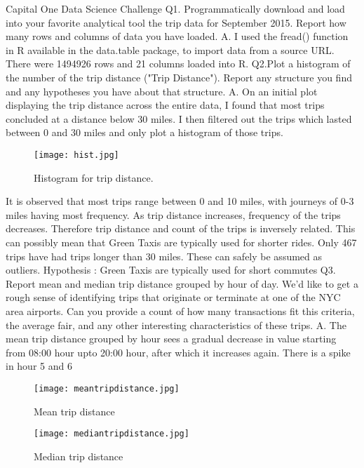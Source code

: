 \documentclass{article}
\begin{document}
\usepackage{graphicx}
\usepackage[space]{grffile}
\graphicspath{{C:\Users\vijay\Desktop}}
Capital One Data Science Challenge \newline
Q1.  Programmatically download and load into your favorite analytical tool the trip data for September 2015. Report how many rows and columns of data you have loaded.\newline
A. I used the fread() function in R available in the data.table package, to import data from a source URL.\newline
There were 1494926 rows and 21 columns loaded into R.\newline
\newline
Q2.Plot a histogram of the number of the trip distance ("Trip Distance"). Report any structure you find and any hypotheses you have about that structure.\newline
A. On an initial plot displaying the trip distance across the entire data, I found that most trips concluded at a distance below 30 miles. I then filtered out the trips which lasted between 0 and 30 miles and only plot a histogram of those trips.\newline
\begin{figure}
  \texttt{[image: hist.jpg]}
  \caption{Histogram for trip distance.}
  \label{fig:Histogram 1}
\end{figure}
\newline
It is observed that most trips range between 0 and 10 miles, with journeys of 0-3 miles having most frequency. As trip distance increases, frequency of the trips decreases. Therefore trip distance and count of the trips is inversely related. This can possibly mean that Green Taxis are typically used for shorter rides.
Only 467 trips have had trips longer than 30 miles. These can safely be assumed as outliers.\newline
Hypothesis : Green Taxis are typically used for short commutes\newline
\newline
Q3. Report mean and median trip distance grouped by hour of day. We'd like to get a rough sense of identifying trips that originate or terminate at one of the NYC area airports. Can you provide a count of how many transactions fit this criteria, the average fair, and any other interesting characteristics of these trips.\newline
A.  The mean trip distance grouped by hour sees a gradual decrease in value starting from 08:00 hour upto 20:00 hour, after which it increases again. There is a spike in hour 5 and 6\newline
\begin{figure}
  \texttt{[image: meantripdistance.jpg]}
  \caption{Mean trip distance}
  \label{fig:Plot 2}
\end{figure} 
\newline
\begin{figure}
  \texttt{[image: mediantripdistance.jpg]}
  \caption{Median trip distance}
  \label{fig:Plot 3}
\end{figure}
\newline
\end{document}
